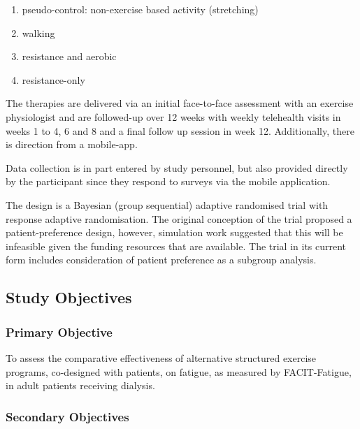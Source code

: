 \documentclass[
]{article}
\begin{document}
\begin{enumerate}
  \item pseudo-control: non-exercise based activity (stretching)
  \item walking
  \item resistance and aerobic
  \item resistance-only
\end{enumerate}

The therapies are delivered via an initial face-to-face assessment with an exercise physiologist and are followed-up over 12 weeks with weekly telehealth visits in weeks 1 to 4, 6 and 8 and a final follow up session in week 12.
Additionally, there is direction from a mobile-app.

Data collection is in part entered by study personnel, but also provided directly by the participant since they respond to surveys via the mobile application.

The design is a Bayesian (group sequential) adaptive randomised trial with response adaptive randomisation.
The original conception of the trial proposed a patient-preference design, however, simulation work suggested that this will be infeasible given the funding resources that are available.
The trial in its current form includes consideration of patient preference as a subgroup analysis.

\clearpage

\hypertarget{background}{%
  \subsection{Study Objectives}\label{objectives}}


\hypertarget{primary-objective}{
  \subsubsection{Primary Objective}{\label{primary-objective}}
}

To assess the comparative effectiveness of alternative structured exercise programs, co-designed with patients, on fatigue, as measured by FACIT-Fatigue, in adult patients receiving dialysis.

\hypertarget{secondary-objectives}{
  \subsubsection{Secondary Objectives}{\label{secondary-objectives}}
}
\end{document}
